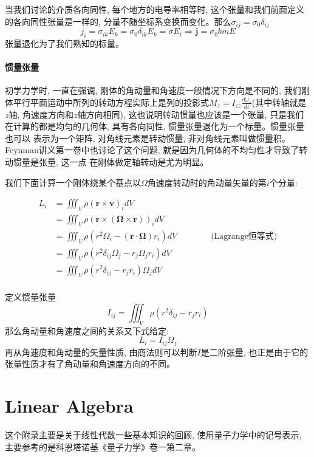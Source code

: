 当我们讨论的介质各向同性, 每个地方的电导率相等时, 这个张量和我们前面定义的各向同性张量是一样的, 分量不随坐标系变换而变化。那么$\sigma_{ij}=\sigma_0\delta_{ij}$
$$j_i=\sigma_{ik}E_k=\sigma_0\delta_{ik}E_k=\sigma E_i\Rightarrow\bm{j}=\sigma_0bm{E}$$张量退化为了我们熟知的标量。
\subsubsection*{惯量张量}
初学力学时, 一直在强调, 刚体的角动量和角速度一般情况下方向是不同的, 我们刚体平行平面运动中所列的转动方程实际上是列的投影式$M_z=I_{zz}\frac{d\omega_z}{dt}$(其中转轴就是
$z$轴, 角速度方向和$z$轴方向相同), 这也说明转动惯量也应该是一个张量, 只是我们在计算的都是均匀的几何体, 具有各向同性, 惯量张量退化为一个标量。惯量张量也可以
表示为一个矩阵, 对角线元素是转动惯量, 非对角线元素叫做惯量积。Feynman讲义第一卷中也讨论了这个问题, 就是因为几何体的不均匀性才导致了转动惯量是张量, 这一点
在刚体做定轴转动是尤为明显。

我们下面计算一个刚体绕某个基点以$\Omega$角速度转动时的角动量矢量的第$i$个分量:
\begin{center}
    \begin{equation*}
        \displaystyle
        \begin{split}
            L_i&=\iiint_V \rho(\bm{r}\times\bm{v})_idV\\
               &=\iiint_V \rho(\bm{r}\times\left(\bm{\Omega}\times\bm{r}\right))_idV\\
               &=\iiint_V \rho\left(r^2\Omega_i-\left(\bm{r}\cdot\bm{\Omega}\right)r_i\right)dV \qquad\qquad\text{(Lagrange恒等式)}\\
               &=\iiint_V \rho\left(r^2\delta_{ij}\Omega_j-r_j\Omega_jr_i\right)dV\\
               &=\iiint_V \rho\left(r^2\delta_{ij}-r_jr_i\right)\Omega_jdV\\
        \end{split}
    \end{equation*}
\end{center}    
定义惯量张量$$I_{ij}=\iiint_V \rho\left(r^2\delta_{ij}-r_jr_i\right)$$
那么角动量和角速度之间的关系又下式给定:
$$L_i=I_{ij}\Omega_j$$
再从角速度和角动量的矢量性质, 由商法则可以判断$I$是二阶张量, 也正是由于它的张量性质才有了角动量和角速度方向的不同。



\chapter{Linear Algebra}
这个附录主要是关于线性代数一些基本知识的回顾, 使用量子力学中的记号表示, 主要参考的是科恩塔诺基《量子力学》卷一第二章。
